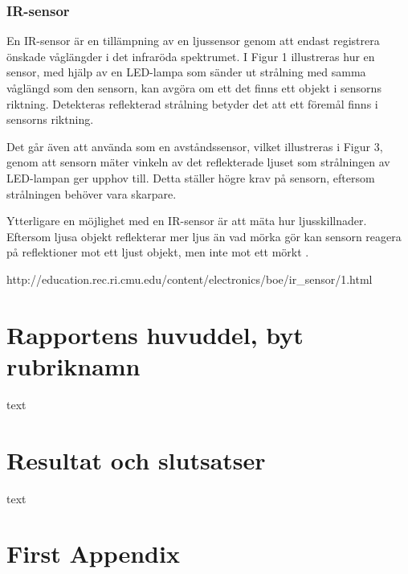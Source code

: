 \documentclass[11pt]{article}
\begin{document}
\begin{flushleft}
\subsubsection{IR-sensor}
En IR-sensor är en tillämpning av en ljussensor genom att endast registrera önskade våglängder i det infraröda spektrumet. I Figur 1 illustreras hur en sensor, med hjälp av en LED-lampa som sänder ut strålning med samma våglängd som den sensorn, kan avgöra om ett det finns ett objekt i sensorns riktning. Detekteras reflekterad strålning betyder det att ett föremål finns i sensorns riktning.

Det går även att använda som en avståndssensor, vilket illustreras i Figur 3, genom att sensorn mäter vinkeln av det reflekterade ljuset som strålningen av LED-lampan ger upphov till. Detta ställer högre krav på sensorn, eftersom strålningen behöver vara skarpare.

Ytterligare en möjlighet med en IR-sensor är att mäta hur ljusskillnader. Eftersom ljusa objekt reflekterar mer ljus än vad mörka gör kan sensorn reagera på reflektioner mot ett ljust objekt, men inte mot ett mörkt . 

http://education.rec.ri.cmu.edu/content/electronics/boe/ir_sensor/1.html


\pagebreak
\section{Rapportens huvuddel, byt rubriknamn}
text

\section{Resultat och slutsatser}
text

\pagebreak
{}



\pagebreak
\appendix
\section{First Appendix}

\end{flushleft}
\end{document}

